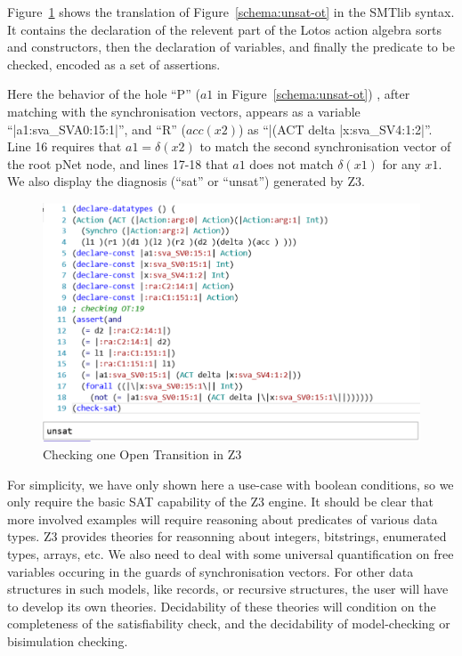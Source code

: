 \documentclass[smallcondensed]{svjour3}
\begin{document}
Figure~\ref{schema:smt-lib} shows the translation of  Figure~\ref{schema:unsat-ot}
in the SMTlib syntax. It contains the declaration
of the relevent part of the Lotos action algebra sorts 
and constructors, then the declaration of variables, and finally the
predicate to be checked, encoded as a set of assertions.

Here the behavior of the hole ``P'' ($a1$ in Figure~\ref{schema:unsat-ot}) , after matching with the synchronisation vectors, appears as a variable
``|a1:sva\_SVA0:15:1|'', and ``R'' ($acc(x2)$) as ``|(ACT delta
|x:sva\_SV4:1:2|''. Line 16 requires that $a1 = \delta(x2)$ to match
the second synchronisation vector of the root pNet node, and lines
17-18 that $a1$ does not match $\delta(x1)$ for any $x1$. 
We also display  the diagnosis (``sat'' or ``unsat'') generated by Z3.

\begin{figure}[t]
    \centerline{\includegraphics[width=0.8\linewidth]{ActaXFIG/rise4fun1}}
  \caption{Checking one Open Transition in Z3}  \label{schema:smt-lib}
\end{figure}

For simplicity, we have only shown here a use-case with boolean conditions, so we only require the basic SAT capability of the Z3
engine. It should be clear that more involved examples will require
reasoning about predicates of various data types. Z3 provides theories for reasonning
about integers, bitstrings, enumerated types, arrays, etc.
We also need to deal with some universal quantification on free
variables occuring in the guards of synchronisation vectors.
For other data structures  in such models, like records, or
recursive structures, the user will have to develop its own theories.
Decidability of these theories will condition on the completeness of the
satisfiability check, and the decidability of model-checking or
bisimulation checking.
\end{document}
